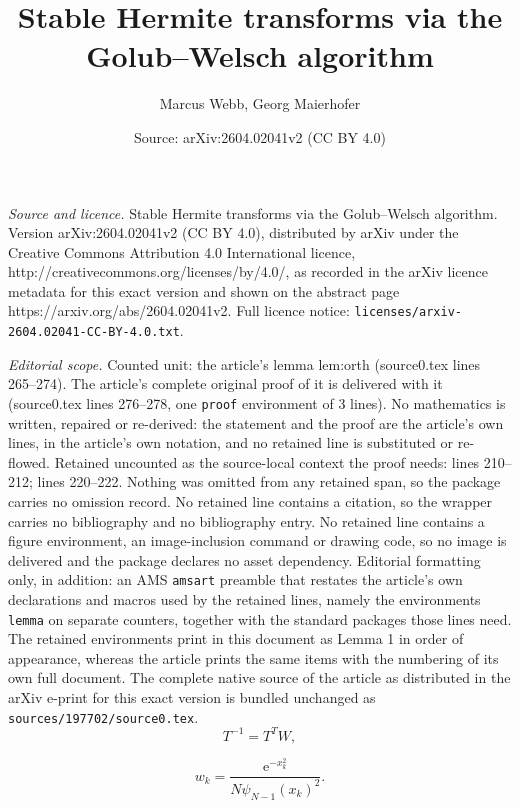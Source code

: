 \documentclass[10pt,a4paper]{amsart}
\title{Stable Hermite transforms via the Golub--Welsch algorithm}
\author{Marcus Webb, Georg Maierhofer}
\date{Source: arXiv:2604.02041v2 (CC BY 4.0)}
\begin{document}
\maketitle

\noindent\emph{Source and licence.} Stable Hermite transforms via the Golub--Welsch algorithm. Version arXiv:2604.02041v2 (CC BY 4.0), distributed by arXiv under the Creative Commons Attribution 4.0 International licence, http://creativecommons.org/licenses/by/4.0/, as recorded in the arXiv licence metadata for this exact version and shown on the abstract page https://arxiv.org/abs/2604.02041v2. Full licence notice: \texttt{licenses/arxiv-2604.02041-CC-BY-4.0.txt}.\par\smallskip

\noindent\textit{Editorial scope.} Counted unit: the article's lemma lem:orth (source0.tex lines 265--274). The article's complete original proof of it is delivered with it (source0.tex lines 276--278, one \texttt{proof} environment of 3 lines). No mathematics is written, repaired or re-derived: the statement and the proof are the article's own lines, in the article's own notation, and no retained line is substituted or re-flowed.  Retained uncounted as the source-local context the proof needs: lines 210--212; lines 220--222.  Nothing was omitted from any retained span, so the package carries no omission record.  No retained line contains a citation, so the wrapper carries no bibliography and no bibliography entry.  No retained line contains a figure environment, an image-inclusion command or drawing code, so no image is delivered and the package declares no asset dependency.  Editorial formatting only, in addition: an AMS \texttt{amsart} preamble that restates the article's own declarations and macros used by the retained lines, namely the environments \texttt{lemma} on separate counters, together with the standard packages those lines need.  The retained environments print in this document as Lemma 1 in order of appearance, whereas the article prints the same items with the numbering of its own full document.  The complete native source of the article as distributed in the arXiv e-print for this exact version is bundled unchanged as \texttt{sources/197702/source0.tex}.
\begin{equation}\label{eqn:Tinv}
    T^{-1} = T^T W,
\end{equation}

\begin{equation}\label{eqn:ghweights}
    w_k = \frac{\mathrm{e}^{-x_k^2}}{N \psi_{N{-}1}(x_k)^2}.
\end{equation}
\end{document}
